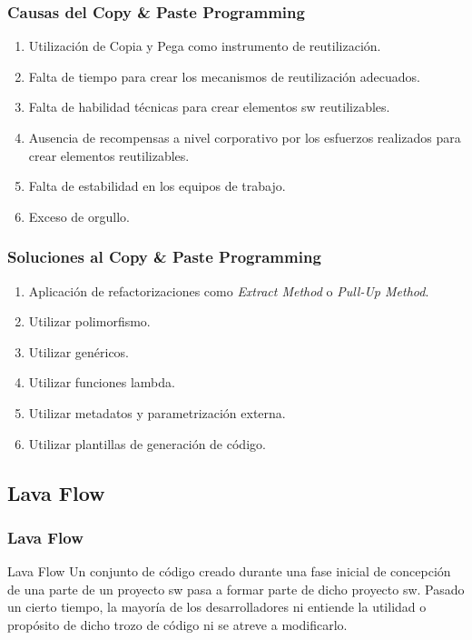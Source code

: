 ﻿\documentclass[animated,a4paper,slidestop,xcolor=pst,blue]{beamer}
\begin{document}
\begin{frame}[c]
	\frametitle{Causas del Copy \& Paste Programming}
    \begin{enumerate} [<+->]
        \item Utilización de Copia y Pega como instrumento de reutilización.
        \item Falta de tiempo para crear los mecanismos de reutilización adecuados.
        \item Falta de habilidad técnicas para crear elementos sw reutilizables.
        \item Ausencia de recompensas a nivel corporativo por los esfuerzos realizados para crear elementos reutilizables.
        \item Falta de estabilidad en los equipos de trabajo.
        \item Exceso de orgullo.
    \end{enumerate}
\end{frame}

\begin{frame}[c]
    \frametitle{Soluciones al Copy \& Paste Programming}
    \begin{enumerate}[<+->]
        \item Aplicación de refactorizaciones como \emph{Extract Method} o \emph{Pull-Up Method}.
        \item Utilizar polimorfismo.
        \item Utilizar genéricos.
        \item Utilizar funciones lambda.
        \item Utilizar metadatos y parametrización externa.
        \item Utilizar plantillas de generación de código.
    \end{enumerate}
\end{frame}

\subsection{Lava Flow}

\begin{frame}
	\frametitle{Lava Flow}
	\begin{block}{Lava Flow}
        Un conjunto de código creado durante una fase inicial de concepción de una parte de un proyecto sw pasa a formar parte de dicho proyecto sw. Pasado un cierto tiempo, la mayoría de los desarrolladores ni entiende la utilidad o propósito de dicho trozo de código ni se atreve a modificarlo.
	\end{block}
\end{frame}
\end{document}
